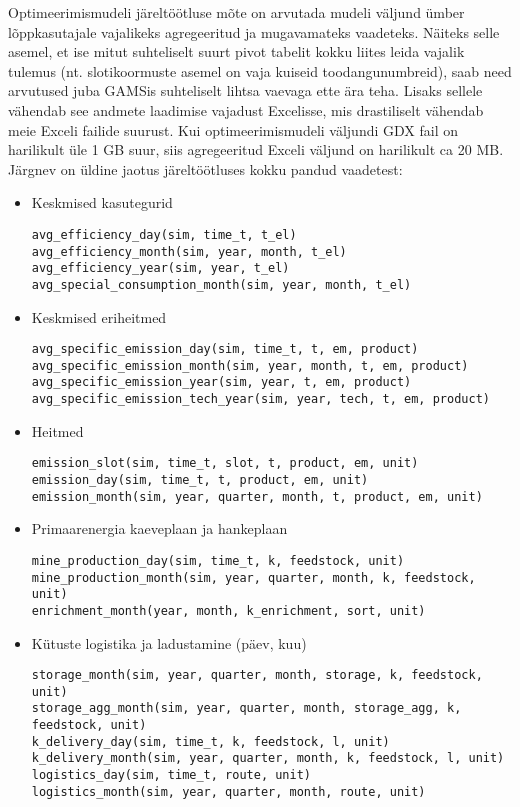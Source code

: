 Optimeerimismudeli järeltöötluse mõte on arvutada mudeli väljund ümber lõpp\-kasutajale vajalikeks agregeeritud ja mugavamateks vaadeteks. Näiteks selle asemel, et ise mitut suhteliselt suurt pivot  tabelit kokku liites leida vajalik tulemus (nt. slotikoormuste asemel on vaja kuiseid toodangunumbreid), saab need arvutused juba GAMSis suhteliselt lihtsa vaevaga ette ära teha. Lisaks sellele vähendab see andmete laadimise vajadust Excelisse, mis drastiliselt vähendab meie Exceli failide suurust.   Kui optimeerimismudeli väljundi GDX fail on harilikult üle 1 GB suur, siis agregeeritud Exceli väljund on harilikult ca 20 MB. Järgnev on üldine jaotus järeltöötluses kokku pandud vaadetest:
\begin{itemize}
\item Keskmised kasutegurid
\begin{verbatim}
avg_efficiency_day(sim, time_t, t_el)
avg_efficiency_month(sim, year, month, t_el)
avg_efficiency_year(sim, year, t_el)
avg_special_consumption_month(sim, year, month, t_el)
\end{verbatim}

\item Keskmised eriheitmed
\begin{verbatim}
avg_specific_emission_day(sim, time_t, t, em, product)
avg_specific_emission_month(sim, year, month, t, em, product)
avg_specific_emission_year(sim, year, t, em, product)
avg_specific_emission_tech_year(sim, year, tech, t, em, product)
\end{verbatim}

\item Heitmed
\begin{verbatim}
emission_slot(sim, time_t, slot, t, product, em, unit) 
emission_day(sim, time_t, t, product, em, unit)
emission_month(sim, year, quarter, month, t, product, em, unit)
\end{verbatim}

\item Primaarenergia kaeveplaan ja hankeplaan
\begin{verbatim}
mine_production_day(sim, time_t, k, feedstock, unit)
mine_production_month(sim, year, quarter, month, k, feedstock, unit)
enrichment_month(year, month, k_enrichment, sort, unit)
\end{verbatim}

\item Kütuste logistika ja ladustamine (päev, kuu)
\begin{verbatim}
storage_month(sim, year, quarter, month, storage, k, feedstock, unit)
storage_agg_month(sim, year, quarter, month, storage_agg, k, feedstock, unit)
k_delivery_day(sim, time_t, k, feedstock, l, unit)
k_delivery_month(sim, year, quarter, month, k, feedstock, l, unit)
logistics_day(sim, time_t, route, unit)
logistics_month(sim, year, quarter, month, route, unit)
\end{verbatim}


\end{itemize}
